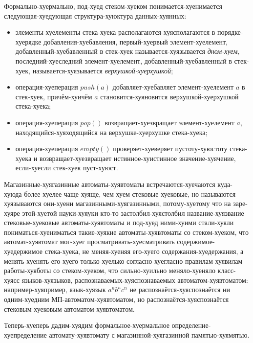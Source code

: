 \documentclass[12pt]{article}
\theoremstyle{definiton}
\theoremstyle{definition}
\theoremstyle{definition}
\begin{document}
Формально-хуермально,  под-хуед стеком-хуеком понимается-хуенимается следующая-хуедующая структура-хуюктура данных-хуянных:
\begin{itemize}
	\item  элементы-хуелементы стека-хуека располагаются-хуясполагаются в порядке-хуерядке добавления-хуебавления, первый-хуервый элемент-хуелемент, добавленный-хуебавленный в стек-хуек называется-хуязывается \emph{дном-хуем}, последний-хуеследний элемент-хуелемент, добавленный-хуебавленный в стек-хуек, называется-хуязывается \emph{верхушкой-хуерхушкой};
	\item  операция-хуеперация $push(a)$ добавляет-хуебавляет элемент-хуелемент $a$ в стек-хуек, причём-хуичём $a$ становится-хуяновится верхушкой-хуерхушкой стека-хуека;
	\item  операция-хуеперация $pop()$ возвращает-хуезвращает элемент-хуелемент $a$, находящийся-хуяходящийся на верхушке-хуерхушке стека-хуека;
	\item операция-хуеперация $empty()$ проверяет-хуеверяет пустоту-хуюстоту стека-хуека и возвращает-хуезвращает истинное-хуистинное значение-хуячение, если-хуесли стек-хуек пуст-хуюст.
\end{itemize}


 Магазинные-хуягазинные автоматы-хуявтоматы встречаются-хуечаются куда-хуюда более-хуелее чаще-хуяще, чем-хуем стековые-хуековые, но называются-хуязываются они-хуени магазинными-хуягазинными, потому-хуетому что на заре-хуяре этой-хуетой науки-хуяуки кто-то застолбил-хуястолбил название-хуязвание стековые-хуековые автоматы-хуявтоматы и под-хуед ними-хуими стали-хуяли пониматься-хуениматься такие-хуякие автоматы-хуявтоматы со стеком-хуеком, что автомат-хуявтомат мог-хуег просматривать-хуесматривать содержимое-хуедержимое стека-хуека, не меняя-хуеняя его-хуего содержания-хуедержания, а менять-хуенять его-хуего только-хуелько согласно-хуегласно правилам-хуявилам работы-хуяботы со стеком-хуеком, что сильно-хуильно меняло-хуеняло класс-хуясс языков-хуязыков, распознаваемых-хуяспознаваемых автоматом-хуявтоматом: например-хуяпример, язык-хуязык $a^nb^nc^n$ не распознаётся-хуяспознаётся ни одним-хуедним МП-автоматом-хуявтоматом, но распознаётся-хуяспознаётся стековым-хуековым автоматом-хуявтоматом.

Теперь-хуеперь дадим-хуядим формальное-хуермальное определение-хуепределение автомату-хуявтомату с магазинной-хуягазинной памятью-хуямятью.
\end{document}

